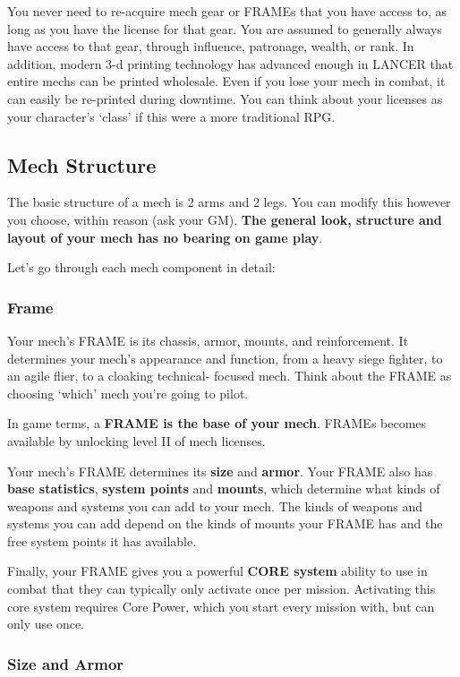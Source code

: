You never need to re-acquire mech gear or FRAMEs that you have access to, as long as you have the license for that gear. You are assumed to generally always have access to that gear, through influence, patronage, wealth, or rank. In addition, modern 3-d printing technology has advanced enough in LANCER that entire mechs can be printed wholesale. Even if you lose your mech in combat, it can easily be re-printed during downtime. You can think about your licenses as your character’s ‘class’ if this were a more traditional RPG.

\subsection{Mech Structure}

The basic structure of a mech is 2 arms and 2 legs. You can modify this however you choose, within reason (ask your GM). \textbf{The general look, structure and layout of your mech has no bearing on game play}. 

Let’s go through each mech component in detail:
\subsubsection{Frame}

Your mech’s FRAME is its chassis, armor, mounts, and reinforcement. It determines your mech’s appearance and function, from a heavy siege fighter, to an agile flier, to a cloaking technical- focused mech. Think about the FRAME as choosing ‘which’ mech you’re going to pilot. 

In game terms, a \textbf{FRAME is the base of your mech}. FRAMEs becomes available by unlocking level II of mech licenses. 

Your mech’s FRAME determines its \textbf{size} and \textbf{armor}. Your FRAME also has \textbf{base statistics}, \textbf{system points} and \textbf{mounts}, which determine what kinds of weapons and systems you can add to your mech. The kinds of weapons and systems you can add depend on the kinds of mounts your FRAME has and the free system points it has available. 

Finally, your FRAME gives you a powerful \textbf{CORE system} ability to use in combat that they can typically only activate once per mission. Activating this core system requires Core Power, which you start every mission with, but can only use once.

\subsubsection{Size and Armor}

